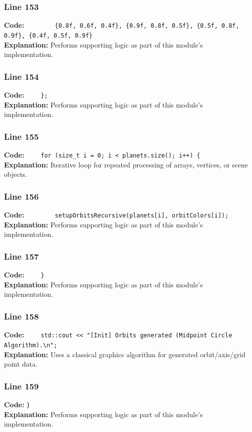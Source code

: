\documentclass[11pt,a4paper]{article}
\begin{document}
\subsubsection*{Line 153}
\textbf{Code:} \verb|        {0.8f, 0.6f, 0.4f}, {0.9f, 0.8f, 0.5f}, {0.5f, 0.8f, 0.9f}, {0.4f, 0.5f, 0.9f}|\\
\textbf{Explanation:} Performs supporting logic as part of this module's implementation.

\subsubsection*{Line 154}
\textbf{Code:} \verb|    };|\\
\textbf{Explanation:} Performs supporting logic as part of this module's implementation.

\subsubsection*{Line 155}
\textbf{Code:} \verb|    for (size_t i = 0; i < planets.size(); i++) {|\\
\textbf{Explanation:} Iterative loop for repeated processing of arrays, vertices, or scene objects.

\subsubsection*{Line 156}
\textbf{Code:} \verb|        setupOrbitsRecursive(planets[i], orbitColors[i]);|\\
\textbf{Explanation:} Performs supporting logic as part of this module's implementation.

\subsubsection*{Line 157}
\textbf{Code:} \verb|    }|\\
\textbf{Explanation:} Performs supporting logic as part of this module's implementation.

\subsubsection*{Line 158}
\textbf{Code:} \verb|    std::cout << "[Init] Orbits generated (Midpoint Circle Algorithm).\n";|\\
\textbf{Explanation:} Uses a classical graphics algorithm for generated orbit/axis/grid point data.

\subsubsection*{Line 159}
\textbf{Code:} \verb|}|\\
\textbf{Explanation:} Performs supporting logic as part of this module's implementation.
\end{document}
